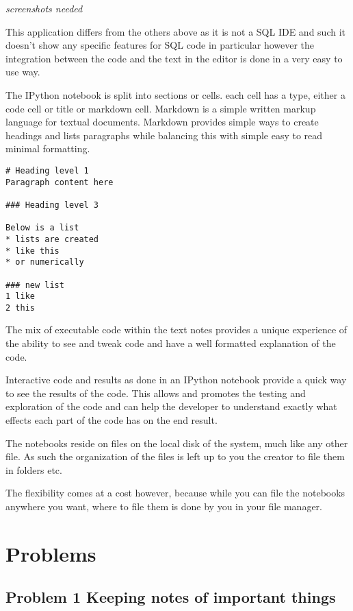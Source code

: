 \emph{screenshots needed}

This application differs from the others above as it is not a SQL IDE
and such it doesn't show any specific features for SQL code in
particular however the integration between the code and the text in the
editor is done in a very easy to use way.

The IPython notebook is split into sections or cells. each cell has a
type, either a code cell or title or markdown cell. Markdown is a simple
written markup language for textual documents. Markdown provides simple
ways to create headings and lists paragraphs while balancing this with
simple easy to read minimal formatting.

\begin{verbatim}
# Heading level 1
Paragraph content here

### Heading level 3

Below is a list
* lists are created
* like this
* or numerically

### new list
1 like
2 this
\end{verbatim}

The mix of executable code within the text notes provides a unique
experience of the ability to see and tweak code and have a well
formatted explanation of the code.

Interactive code and results as done in an IPython notebook provide a
quick way to see the results of the code. This allows and promotes the
testing and exploration of the code and can help the developer to
understand exactly what effects each part of the code has on the end
result.

The notebooks reside on files on the local disk of the system, much like
any other file. As such the organization of the files is left up to you
the creator to file them in folders etc.

The flexibility comes at a cost however, because while you can file the
notebooks anywhere you want, where to file them is done by you in your
file manager.

\section{Problems}\label{problems}

\subsection{Problem 1 Keeping notes of important
things}\label{problem-1-keeping-notes-of-important-things}

